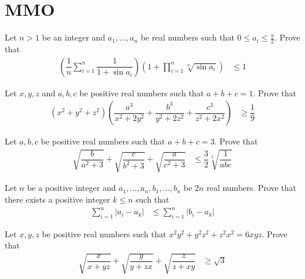 \documentclass{subfile}
\begin{document}
	\section{MMO}\label{sec:mmo}
	
		\begin{problem}[$2018$, problem $1$]
			Let $n>1$ be an integer and $a_{1},\ldots,a_{n}$ be real numbers such that $0\leq a_{i}\leq \frac{\pi}{2}$. Prove that
				\begin{align*}
					\left(\dfrac{1}{n}\sum_{i=1}^{n}\dfrac{1}{1+\sin{a_{i}}}\right)\left(1+\prod_{i=1}^{n}\sqrt[n]{\sin{a_{i}}}\right)
						& \leq 1
				\end{align*}
		\end{problem}
	
		\begin{problem}[$2017$, problem $4$]
			Let $x,y,z$ and $a,b,c$ be positive real numbers such that $a+b+c=1$. Prove that
				\begin{align*}
					(x^{2}+y^{2}+z^{2})\left(\dfrac{a^{3}}{x^{2}+2y^{2}}+\dfrac{b^{3}}{y^{2}+2z^{2}}+\dfrac{c^{3}}{z^{2}+2x^{2}}\right)
						& \geq \dfrac{1}{9}
				\end{align*}
		\end{problem}
	
		\begin{problem}[$2016$, problem $2$]
			Let $a,b,c$ be positive real numbers such that $a+b+c=3$. Prove that
				\begin{align*}
					\sqrt{\dfrac{b}{a^{2}+3}}+\sqrt{\dfrac{c}{b^{2}+3}}+\sqrt{\dfrac{a}{c^{2}+3}}
						& \leq \dfrac{3}{2}\sqrt[4]{\dfrac{1}{abc}}
				\end{align*}
		\end{problem}
	
		\begin{problem}[$2014$, problem $1$]
			Let $n$ be a positive integer and $a_{1},\ldots,a_{n},b_{1},\ldots,b_{n}$ be $2n$ real numbers. Prove that there exists a positive integer $k\leq n$ such that
				\begin{align*}
					\sum_{i=1}^{n}|a_{i}-a_{k}|
						& \leq \sum_{i=1}^{n}|b_{i}-a_{k}|
				\end{align*}
		\end{problem}
	
		\begin{problem}[$2013$, problem $3$]
			Let $x,y,z$ be positive real numbers such that $x^{2}y^{2}+y^{2}z^{2}+z^{2}x^{2}=6xyz$. Prove that
				\begin{align*}
					\sqrt{\dfrac{x}{x+yz}}+\sqrt{\dfrac{y}{y+zx}}+\sqrt{\dfrac{z}{z+xy}}
						& \geq \sqrt{3}
				\end{align*}
		\end{problem}
	
\end{document}
